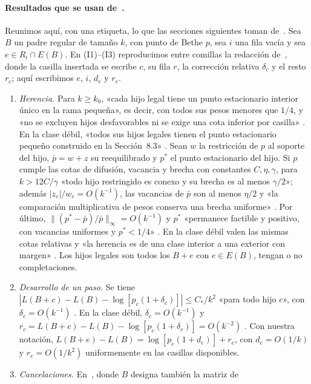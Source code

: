 \paragraph{Resultados que se usan de~\cite{pred}.}
Reunimos aquí, con una etiqueta, lo que las secciones siguientes toman de~\cite{pred}. Sea $B$ un
padre regular de tamaño $k$, con punto de Bethe $p$, sea $i$ una fila vacía y sea
$e\in R_i\cap E(B)$. En (I1)--(I3) reproducimos entre comillas la redacción de~\cite{pred}, donde la
casilla insertada se escribe $c$, su fila $r$, la corrección relativa $\delta_c$ y el resto $r_c$;
aquí escribimos $e$, $i$, $d_e$ y $r_e$.
\begin{enumerate}[({I}1)]
\item \emph{Herencia.} Para $k\ge k_0$, «cada hijo legal tiene un punto estacionario interior único
en la rama pequeña», es decir, con todos sus pesos menores que $1/4$, y «no se excluyen hijos
desfavorables ni se exige una cota inferior por casilla» \cite[Teorema~7.1]{pred}. En la clase
débil, «todos sus hijos legales tienen el punto estacionario pequeño construido en la
Sección~8.3» \cite[Teorema~8.1]{pred}. Sean $w$ la restricción de $p$ al soporte del hijo,
$\bar p=w+z$ su reequilibrado y $p^*$ el punto estacionario del hijo. Si $p$ cumple las cotas de
difusión, vacancia y brecha con constantes $C,\eta,\gamma$, para $k>12C/\gamma$ «todo hijo
restringido es conexo y su brecha es al menos $\gamma/2$»; además $|z_e|/w_e=O(k^{-1})$, las
vacancias de $\bar p$ son al menos $\eta/2$ y «la comparación multiplicativa de pesos conserva una
brecha uniforme» \cite[Sección~6.5]{pred}. Por último, $\|(p^*-\bar p)/\bar p\|_\infty=O(k^{-1})$ y
$p^*$ «permanece factible y positivo, con vacancias uniformes y $p^*<1/4$»
\cite[Sección~7.2]{pred}. En la clase débil valen las mismas cotas relativas y «la herencia es de
una clase interior a una exterior con margen» \cite[Secciones~8.2 y~8.3]{pred}. Los hijos legales son
todos los $B+e$ con $e\in E(B)$, tengan o no completaciones.
\item \emph{Desarrollo de un paso.} Se tiene
$|L(B+c)-L(B)-\log[p_c(1+\delta_c)]|\le C_*/k^2$ «para todo hijo $c$», con
$\delta_c=O(k^{-1})$ \cite[Teorema~7.1]{pred}. En la clase débil, $\delta_c=O(k^{-1})$ y
$r_c=L(B+c)-L(B)-\log[p_c(1+\delta_c)]=O(k^{-2})$ \cite[Secciones~7.8, 8.2 y~8.5]{pred}. Con
nuestra notación, $L(B+e)-L(B)=\log[p_e(1+d_e)]+r_e$, con $d_e=O(1/k)$ y $r_e=O(1/k^2)$
uniformemente en las casillas disponibles.
\item \emph{Cancelaciones.} En~\cite[Sección~6.1]{pred}, donde $B$ designa también la matriz de

\end{enumerate}
